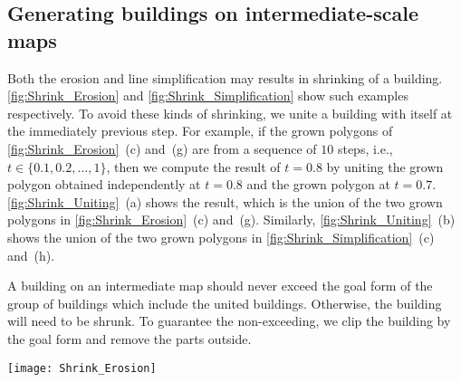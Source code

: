 \subsection{Generating buildings on intermediate-scale maps}
\label{sec:Unite}

Both the erosion and line simplification may results in shrinking of a 
building.
\fig\ref{fig:Shrink_Erosion} and \fig\ref{fig:Shrink_Simplification} show such 
examples respectively.
To avoid these kinds of shrinking,
we unite a building with itself at the immediately previous step.
For example, if the grown polygons of 
\fig\ref{fig:Shrink_Erosion}~(c) and~(g) 
are from a sequence of $10$ steps, 
i.e., $t \in \{0.1, 0.2, \dots, 1\}$, 
then we compute the result of $t=0.8$ by uniting 
the grown polygon obtained independently at $t=0.8$ and 
the grown polygon at $t=0.7$. 
\fig\ref{fig:Shrink_Uniting}~(a) shows the result,
which is the union of the two grown polygons in 
\fig\ref{fig:Shrink_Erosion}~(c) and~(g).
Similarly, \fig\ref{fig:Shrink_Uniting}~(b) shows the union of the two grown 
polygons in 
\fig\ref{fig:Shrink_Simplification}~(c) and~(h).

A building on an intermediate map should never exceed
the goal form of the group of buildings 
which include the united buildings. 
Otherwise, the building will need to be shrunk.
To guarantee the non-exceeding, 
we clip the building by the goal form 
and remove the parts outside.

\begin{figure*}[tb]
	\centering
	\texttt{[image: Shrink\_Erosion]}
	\caption{A building shrinks during growing because of dilation and erosion, 
		where $t_1=0.6$, $t_2=0.7$, and $t_3=1$.
		The small gray polygons represent the original building.
		(a) Grow and Dilate the building with distances $\dtrm[1]{G}$ and 
		$\dtrm[1]{D}$, respectively;
		(b) Erode the polygon in (a) with distance $\dtrm[1]{D} + \dtrm[1]{E}$;
		(c) Dilate the polygon in (b) with distance $\dtrm[1]{E}$.
		(d) The large gray polygon is the target shape on goal map.
		The process for (e), (f), and (g) is the same as the process of (a), 
		(b), and (c).
		The darker gray piece in (g) shows 
		the part which is included in the grown polygon of (c), 
		but not in the grown polygon of (g).
	}
	\label{fig:Shrink_Erosion}
\end{figure*}

